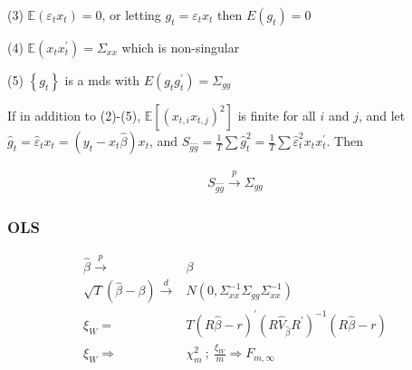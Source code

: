 (3) $\mathbb{E}\left(\varepsilon_t x_t\right)=0$, or letting $g_t=\varepsilon_t x_t$ then $E\left(g_t\right)=0$

(4) $\mathbb{E}\left(x_t x_t^{\prime}\right)=\Sigma_{x x}$ which is non-singular

(5) $\left\{g_t\right\}$ is a mds with $E\left(g_t g_t^{\prime}\right)=\Sigma_{g g}$

If in addition to (2)-(5), $\mathbb{E}\left[\left(x_{t, i} x_{t, j}\right)^2\right]$ is finite for all $i$ and $j$, and let $\widehat{g}_t=\widehat{\varepsilon}_t x_t=(y_t-x_t \widehat{\beta})x_t$, and $S_{\hat{g} \hat{g}}=\frac{1}{T} \sum \widehat{g}_t^2=\frac{1}{T} \sum \hat{\varepsilon}_t^2 x_t x_t^{\prime}$. Then

\begin{align*}
    S_{\hat{g} \hat{g}} \stackrel{p}{\rightarrow} \Sigma_{g g}
\end{align*}

\subsubsection{OLS} 

\begin{align*}
    \widehat{\beta} \stackrel{p}{\rightarrow}& \beta \\
    \sqrt{T}(\widehat{\beta}-\beta) \stackrel{d}{\rightarrow}& N\left(0, \Sigma_{x x}^{-1} \Sigma_{g g} \Sigma_{x x}^{-1}\right) \\
    \xi_W=&T(R \widehat{\beta}-r)^{\prime}\left(R \widehat{V}_{\widehat{\beta}} R^{\prime}\right)^{-1}(R \widehat{\beta}-r)\\
    \xi_W \Rightarrow& \chi_m^2 \: ; \:
    \frac{\xi_W}{m} \Rightarrow F_{m, \infty}
\end{align*}





